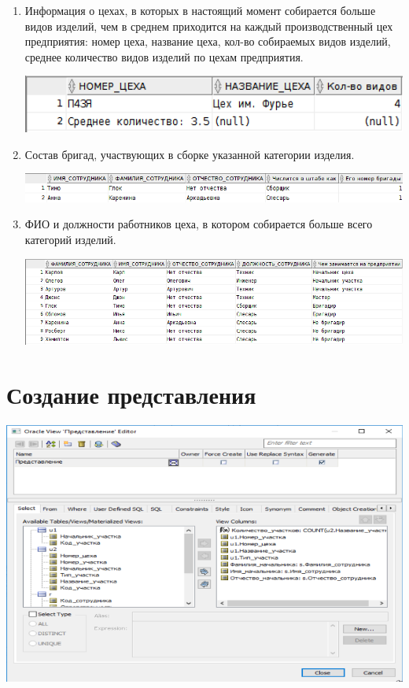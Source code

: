 \begin{enumerate}
    \item Информация о цехах, в которых в настоящий момент собирается больше видов изделий, чем в среднем приходится на каждый производственный цех предприятия: номер цеха, название цеха, кол-во собираемых видов изделий, среднее количество видов изделий по цехам предприятия.

    

    \includegraphics[width=16cm]{./screenshots/results/result8.png}

    \item Состав бригад, участвующих в сборке указанной категории изделия.

    

    \includegraphics[width=16cm]{./screenshots/results/result9.png}

    \item ФИО и должности работников цеха, в котором собирается больше всего категорий изделий.

    

    \includegraphics[width=16cm]{./screenshots/results/result10.png}

\end{enumerate}

\section{Создание представления}

\includegraphics[width=16cm]{./screenshots/view/select_page.png}

